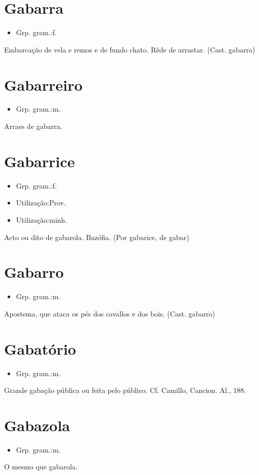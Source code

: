\section{Gabarra}
\begin{itemize}
\item {Grp. gram.:f.}
\end{itemize}
Embarcação de vela e remos e de fundo chato.
Rêde de arrastar.
(Cast. \textunderscore gabarra\textunderscore )
\section{Gabarreiro}
\begin{itemize}
\item {Grp. gram.:m.}
\end{itemize}
Arraes de gabarra.
\section{Gabarrice}
\begin{itemize}
\item {Grp. gram.:f.}
\end{itemize}
\begin{itemize}
\item {Utilização:Prov.}
\end{itemize}
\begin{itemize}
\item {Utilização:minh.}
\end{itemize}
Acto ou dito de gabarola.
Bazófia.
(Por \textunderscore gabarice\textunderscore , de \textunderscore gabar\textunderscore )
\section{Gabarro}
\begin{itemize}
\item {Grp. gram.:m.}
\end{itemize}
Apostema, que ataca os pés dos cavallos e dos bois.
(Cast. \textunderscore gabarro\textunderscore )
\section{Gabatório}
\begin{itemize}
\item {Grp. gram.:m.}
\end{itemize}
Grande gabação pública ou feita pelo público. Cf. Camillo, \textunderscore Cancion. Al.\textunderscore , 188.
\section{Gabazola}
\begin{itemize}
\item {Grp. gram.:m.}
\end{itemize}
O mesmo que \textunderscore gabarola\textunderscore .
